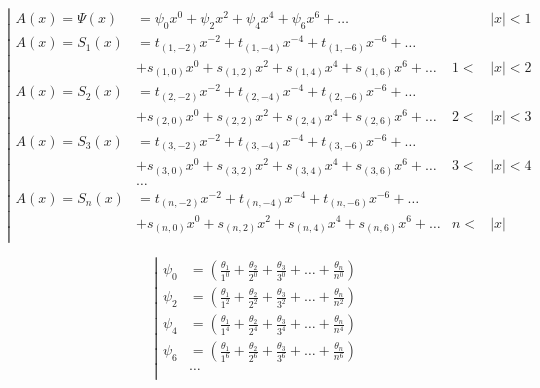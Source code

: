 \begin{equation*} \left| \begin{aligned}
A(x) = \Psi(x) &=
  \psi_0 x^0 
+ \psi_2 x^2
+ \psi_4 x^4 
+ \psi_6 x^6 
+ \ldots &
&|x| < 1 \\
%
A(x) = S_1(x) &= 
  t_{(1,-2)} x^{-2}
+ t_{(1,-4)} x^{-4}
+ t_{(1,-6)} x^{-6}
+ \ldots \\ &
+ s_{(1,0)} x^0
+ s_{(1,2)} x^2
+ s_{(1,4)} x^4
+ s_{(1,6)} x^6
+ \ldots &
1 < &|x| < 2 \\
%
A(x) = S_2(x) &= 
  t_{(2,-2)} x^{-2}
+ t_{(2,-4)} x^{-4}
+ t_{(2,-6)} x^{-6}
+ \ldots \\ &
+ s_{(2,0)} x^0
+ s_{(2,2)} x^2
+ s_{(2,4)} x^4
+ s_{(2,6)} x^6
+ \ldots &
2 < &|x| < 3 \\
%
A(x) = S_3(x) &= 
  t_{(3,-2)} x^{-2}
+ t_{(3,-4)} x^{-4}
+ t_{(3,-6)} x^{-6}
+ \ldots \\ &
+ s_{(3,0)} x^0
+ s_{(3,2)} x^2
+ s_{(3,4)} x^4
+ s_{(3,6)} x^6
+ \ldots &
3 < &|x| < 4 \\
%
&\ldots \\
%
A(x) = S_n(x) &= 
  t_{(n,-2)} x^{-2}
+ t_{(n,-4)} x^{-4}
+ t_{(n,-6)} x^{-6}
+ \ldots \\ &
+ s_{(n,0)} x^0
+ s_{(n,2)} x^2
+ s_{(n,4)} x^4
+ s_{(n,6)} x^6
+ \ldots &
n < &|x| \\
\end{aligned} \right. \end{equation*}

\begin{equation*} \left| \begin{aligned}
\psi_0 &= \left(
  \frac{\theta_1}{1^0}
+ \frac{\theta_2}{2^0}
+ \frac{\theta_3}{3^0}
+ \ldots
+ \frac{\theta_n}{n^0} \right) \\
%
\psi_2 &= \left(
  \frac{\theta_1}{1^2}
+ \frac{\theta_2}{2^2}
+ \frac{\theta_3}{3^2}
+ \ldots
+ \frac{\theta_n}{n^2} \right) \\
%
\psi_4 &= \left(
  \frac{\theta_1}{1^4}
+ \frac{\theta_2}{2^4}
+ \frac{\theta_3}{3^4}
+ \ldots
+ \frac{\theta_n}{n^4} \right) \\
%
\psi_6 &= \left(
  \frac{\theta_1}{1^6}
+ \frac{\theta_2}{2^6}
+ \frac{\theta_3}{3^6}
+ \ldots
+ \frac{\theta_n}{n^6} \right) \\
%
&\ldots \\
\end{aligned} \right. \end{equation*}

